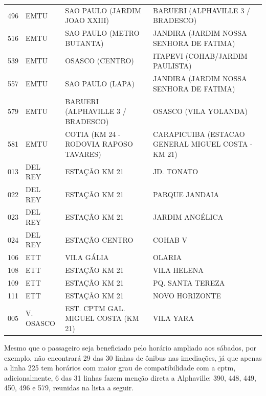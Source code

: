 \begin{center}
\begin{longtable}{|l|l|p{4.5cm}|p{4.5cm}|}
			496 & EMTU & SAO PAULO (JARDIM JOAO XXIII) & BARUERI (ALPHAVILLE 3 / BRADESCO) \\
			516 & EMTU & SAO PAULO (METRO BUTANTA) & JANDIRA (JARDIM NOSSA SENHORA DE FATIMA) \\
			539 & EMTU & OSASCO (CENTRO) & ITAPEVI (COHAB/JARDIM PAULISTA) \\
			557 & EMTU & SAO PAULO (LAPA) & JANDIRA (JARDIM NOSSA SENHORA DE FATIMA) \\
			579 & EMTU & BARUERI (ALPHAVILLE 3 / BRADESCO) & OSASCO (VILA YOLANDA) \\
			581 & EMTU & COTIA (KM 24 - RODOVIA RAPOSO TAVARES) & CARAPICUIBA (ESTACAO GENERAL MIGUEL COSTA - KM 21) \\
			013 & DEL REY & ESTAÇÃO KM 21 & JD. TONATO \\
			022 & DEL REY & ESTAÇÃO KM 21 & PARQUE JANDAIA \\
			023 & DEL REY & ESTAÇÃO KM 21 & JARDIM ANGÉLICA \\
			024 & DEL REY & ESTAÇÃO CENTRO & COHAB V \\
			106 & ETT & VILA GÁLIA & OLARIA \\
			108 & ETT & ESTAÇÃO KM 21 & VILA HELENA \\
			109 & ETT & ESTAÇÃO KM 21 & PQ. SANTA TEREZA \\
			111 & ETT & ESTAÇÃO KM 21 & NOVO HORIZONTE \\
			005 & V. OSASCO & EST. CPTM GAL. MIGUEL COSTA (KM 21) & VILA YARA \\
		\end{longtable}
	\end{center}
	
	Mesmo que o passageiro seja beneficiado pelo horário ampliado aos sábados, por exemplo, não encontrará 29 das 30 linhas de ônibus nas imediações, já que apenas a linha 225 tem horários com maior grau de compatibilidade com a \gls{cptm}, adicionalmente, 6 das 31 linhas fazem menção direta a Alphaville: 390, 448, 449, 450, 496 e 579, reunidas na lista a seguir.
	
